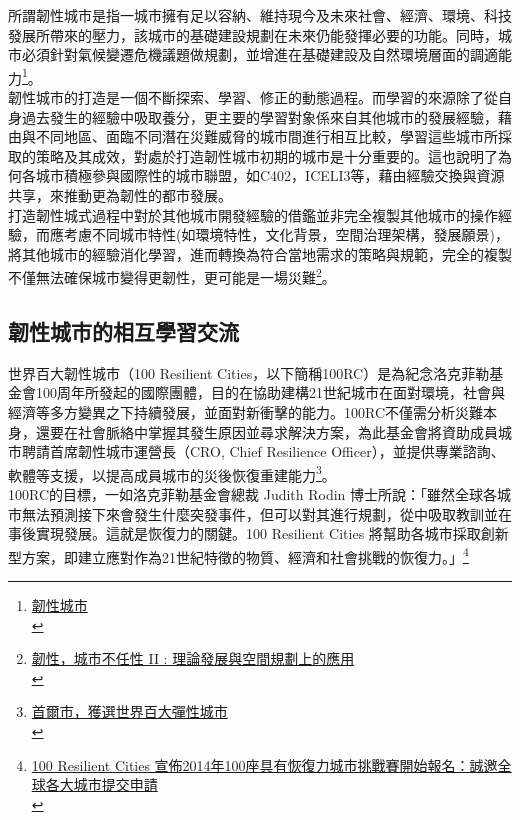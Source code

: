 \documentclass[a4paper,12pt]{article}
\begin{document}
所謂韌性城市是指一城市擁有足以容納、維持現今及未來社會、經濟、環境、科技發展所帶來的壓力，該城市的基礎建設規劃在未來仍能發揮必要的功能。同時，城市必須針對氣候變遷危機議題做規劃，並增進在基礎建設及自然環境層面的調適能力\footnote{\href{https://wiki.mbalib.com/zh-tw/\%E9\%9F\%A7\%E6\%80\%A7\%E5\%9F\%8E\%E5\%B8\%82}{韌性城市}\\\label{orgd3fe60e}}。\\

韌性城市的打造是一個不斷探索、學習、修正的動態過程。而學習的來源除了從自身過去發生的經驗中吸取養分，更主要的學習對象係來自其他城市的發展經驗，藉由與不同地區、面臨不同潛在災難威脅的城市間進行相互比較，學習這些城市所採取的策略及其成效，對處於打造韌性城市初期的城市是十分重要的。這也說明了為何各城市積極參與國際性的城市聯盟，如C402，ICELI3等，藉由經驗交換與資源共享，來推動更為韌性的都市發展。\\

打造韌性城式過程中對於其他城市開發經驗的借鑑並非完全複製其他城市的操作經驗，而應考慮不同城市特性(如環境特性，文化背景，空間治理架構，發展願景)，將其他城市的經驗消化學習，進而轉換為符合當地需求的策略與規範，完全的複製不僅無法確保城市變得更韌性，更可能是一場災難\footnote{\href{https://eyesonplace.net/2016/05/11/2201/}{韌性，城市不任性 II : 理論發展與空間規劃上的應用}\\}。\\
\newpage

\subsection{韌性城市的相互學習交流}
\label{sec:org1ed4924}

世界百大韌性城市（100 Resilient Cities，以下簡稱100RC）是為紀念洛克菲勒基金會100周年所發起的國際團體，目的在協助建構21世紀城市在面對環境，社會與經濟等多方變異之下持續發展，並面對新衝擊的能力。100RC不僅需分析災難本身，還要在社會脈絡中掌握其發生原因並尋求解決方案，為此基金會將資助成員城市聘請首席韌性城市運營長（CRO, Chief Resilience Officer），並提供專業諮詢、軟體等支援，以提高成員城市的災後恢復重建能力\footnote{\href{http://tchinese.seoul.go.kr/\%E9\%A6\%96\%E7\%88\%BE\%E5\%B8\%82\%EF\%BC\%8C\%E7\%8D\%B2\%E9\%81\%B8\%E4\%B8\%96\%E7\%95\%8C\%E7\%99\%BE\%E5\%A4\%A7\%E5\%BD\%88\%E6\%80\%A7\%E5\%9F\%8E\%E5\%B8\%82/?print=print}{首爾市，獲選世界百大彈性城市}\\}。\\

100RC的目標，一如洛克菲勒基金會總裁 Judith Rodin 博士所說：「雖然全球各城市無法預測接下來會發生什麼突發事件，但可以對其進行規劃，從中吸取教訓並在事後實現發展。這就是恢復力的關鍵。100 Resilient Cities 將幫助各城市採取創新型方案，即建立應對作為21世紀特徵的物質、經濟和社會挑戰的恢復力。」\footnote{\href{https://hk.prnasia.com/story/101563-2.shtml}{100 Resilient Cities 宣佈2014年100座具有恢復力城市挑戰賽開始報名：誠邀全球各大城市提交申請}\\}\\
\end{document}
